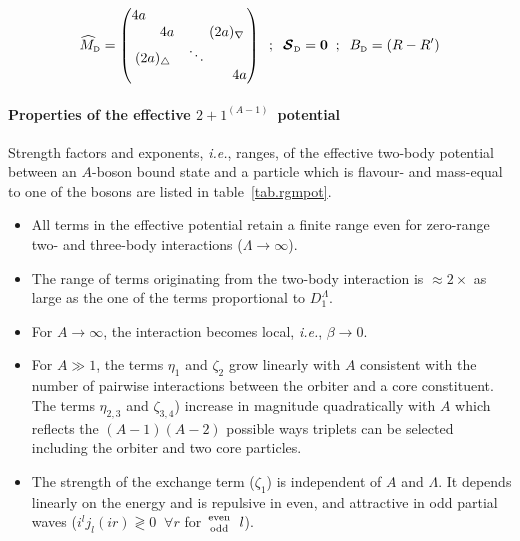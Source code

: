 \documentclass
[aps,nofootinbib,prl,showpacs,twocolumn,groupedaddress,superscriptaddress]
{revtex4}
\def\cM{{\widehat{M}}}
\newcommand{\subd}{_\text{\tiny D}}
\def\cS{{\mathcal S}}
\newcommand*{\mprime}{^{\prime}\mkern-1.2mu}
\newcommand*{\mdprime}{^{\prime\prime}\mkern-1.2mu}
\newcommand{\ie}{\textit{i.e.}\;}
\newcommand{\ve}[1]{\ensuremath{\boldsymbol{#1}}}
\newcommand{\abb}{\ensuremath{2\!+\!1^{(A-1)}}}
\newcommand{\tabref}[1]{table~\ref{#1}}
\begin{document}
\begin{gather}
\cM\subd=\begin{pmatrix}4a & & & \\ & 4a & &\multicolumn{2}{l}{\!\!\!\!(2a)_\nabla}\\
 \multicolumn{2}{c}{(2a)_\triangle} & \ddots & \\ & & & & 4a \\\end{pmatrix}
\;\;;\;\;\ve{\cS}\subd =\ve{0}\;\;;\;\;B\subd =(R-R')
\end{gather}

\paragraph*{Properties of the effective \abb~potential}
Strength factors and exponents, \ie, ranges, of the effective two-body potential between an
$A$-boson bound state and a particle which is flavour- and mass-equal to one of the bosons are
listed in \tabref{tab.rgmpot}.
\begin{itemize}
\item All terms in the effective potential retain a finite range even for zero-range two- and three-body
interactions ($\Lambda\to\infty$).
\item The range of terms originating from the two-body interaction is $\approx 2\times$ as large as the one
of the terms proportional to $D_1^\Lambda$.
\item For $A\to\infty$, the interaction becomes local, \ie, $\beta\to0$.
\item For $A\gg1$, the terms $\eta_1$ and $\zeta_2$ grow linearly with $A$ consistent with the number
of pairwise interactions between the orbiter and a core constituent. The terms
$\eta_{2,3}$ and $\zeta_{3,4}$) increase in magnitude quadratically with $A$ which reflects the $(A-1)(A-2)$
possible ways triplets can be selected including the orbiter and two core particles.
\item The strength of the exchange term ($\zeta_1$) is independent of $A$ and $\Lambda$. It depends linearly
on the energy and is repulsive in even, and attractive in odd partial waves ($i^lj_l(ir)\gtrless0\;\;\forall r$ for ${\text{even}\atop\text{odd}}\;\;l$).
\end{itemize}

% 
%
\newpage
\end{document}
